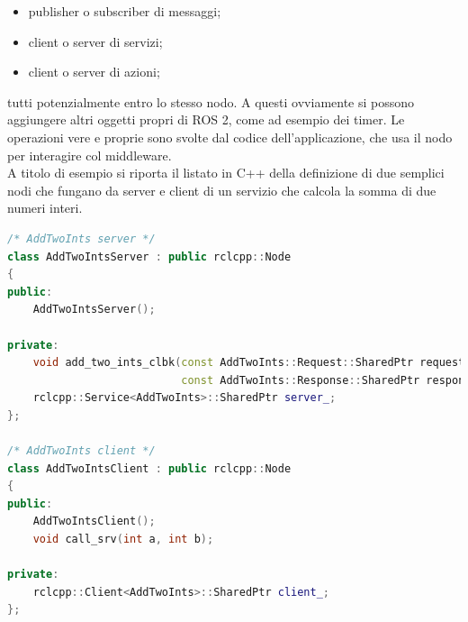 \begin{itemize}
    \item publisher o subscriber di messaggi;
    \item client o server di servizi;
    \item client o server di azioni;
\end{itemize}
tutti potenzialmente entro lo stesso nodo. A questi ovviamente si possono aggiungere altri oggetti propri di ROS 2, come ad esempio dei timer. Le operazioni vere e proprie sono svolte dal codice dell'applicazione, che usa il nodo per interagire col middleware.\\
A titolo di esempio si riporta il listato in C++ della definizione di due semplici nodi che fungano da server e client di un servizio che calcola la somma di due numeri interi.\newpage

\begin{lstlisting}[language=C++, caption=Definizione delle classi dei nodi server e client del servizio \emph{AddTwoInts}.]
/* AddTwoInts server */
class AddTwoIntsServer : public rclcpp::Node
{
public:
    AddTwoIntsServer();

private:
    void add_two_ints_clbk(const AddTwoInts::Request::SharedPtr request,
                           const AddTwoInts::Response::SharedPtr response);
    rclcpp::Service<AddTwoInts>::SharedPtr server_;
};

/* AddTwoInts client */
class AddTwoIntsClient : public rclcpp::Node
{
public:
    AddTwoIntsClient();
    void call_srv(int a, int b);

private:
    rclcpp::Client<AddTwoInts>::SharedPtr client_;
};
\end{lstlisting}
\newpage

